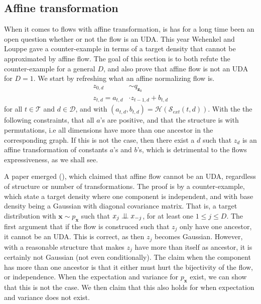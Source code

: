 \subsection{Affine transformation}
When it comes to flows with affine transformation, is has for a long time been an open
question whether or not the flow is an UDA. This year Wehenkel and Louppe gave a 
counter-example in terms of a target density that cannot be approximated by affine flow. 
The goal of this section is to both refute the counter-example for a general \(D\), 
and also prove that affine flow is not an UDA for \(D = 1\). We start by refreshing what
an affine normalizing flow is.
\begin{align}
    z_{0,d} &\sim q_{\bm{z}_0}\\
    z_{t,d} = a_{t,d}&\cdot z_{t-1,d} + b_{t,d}\label{eq:affine_trans}
\end{align}
for all \(t\in \mathcal{T}\) and \(d\in \mathcal{D}\), and with 
\((a_{t,d}, b_{t,d}) = \mathcal{H}(\mathcal{S}_{ext}(t,d))\). With the the following constraints,
that all \(a\)'s are positive, and that the structure is with permutations, i.e all dimensions have 
more than one ancestor in the corresponding graph. If this is not the case, then there exist a \(d\) such that 
\(z_d\) is an affine transformation of constants \(a\)'s and \(b\)'s, which is detrimental to
the flows expressiveness, as we shall see. 

A paper emerged (\cite{wehenkel}), which claimed that affine flow cannot be an UDA, regardless of structure 
or number of transformations. The proof is by a counter-example, which state a target density where one component is 
independent, and with base density being a Gaussian with diagonal covariance matrix. That is, a target distribution
with \(\bm x \sim p_{\bm x}\) such that \(x_j \perp\!\!\!\perp x_{-j}\), for at least one \(1 \leq j \leq D\). The first argument 
that if the flow is construced such that \(z_j\) only have one ancestor, it cannot be an UDA. This is correct, as then 
\(z_j\) becomes Gaussian. However, with a reasonable structure that makes \(z_j\) have more than itself as ancestor, it 
is certainly not Gaussian (not even conditionally). The claim when the component has more than one ancestor is that 
it either must hurt the bijectivity of the flow, or independence. When the expectation and variance for \(p_{\bm x}\) exist,
we can show that this is not the case. We then claim that this also holds for when expectation and variance does not exist.


